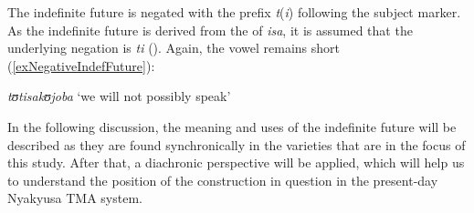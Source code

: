 The indefinite future is negated with the  prefix \textit{t}(\textit{i}) following the subject marker. As the indefinite future is derived from the  of  \textit{isa}, it is assumed that the underlying negation is \textit{ti} (). Again, the vowel remains short (\ref{exNegativeIndefFuture}):

\begin{exe}
\ex \label{exNegativeIndefFuture}\textit{tʊtisakʊjoba} \lq we will not possibly speak' 
\end{exe}

In the following discussion, the meaning and uses of the indefinite future will be described as they are found synchronically in the varieties that are in the focus of this study. After that, a diachronic perspective will be applied, which will help us to understand the position of the construction in question in the present-day Nyakyusa TMA system.

